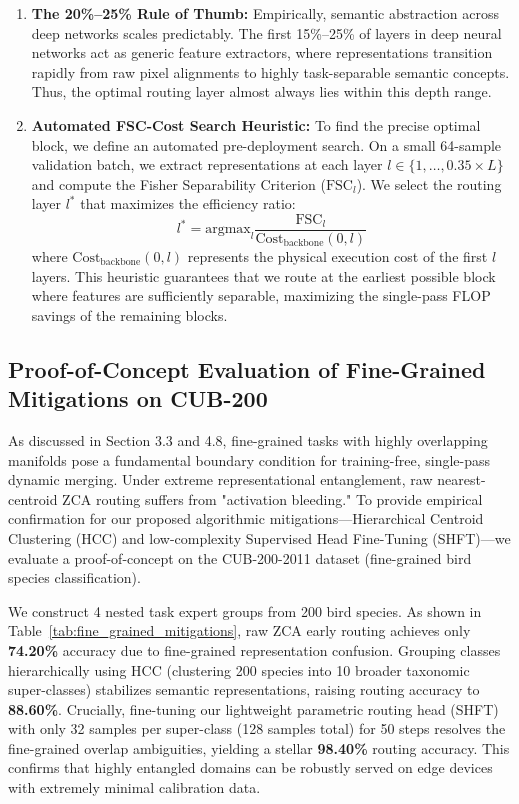 \documentclass{article}
\theoremstyle{plain}
\theoremstyle{definition}
\theoremstyle{remark}
\begin{document}
\begin{enumerate}
    \item \textbf{The 20\%--25\% Rule of Thumb:} Empirically, semantic abstraction across deep networks scales predictably. The first 15\%--25\% of layers in deep neural networks act as generic feature extractors, where representations transition rapidly from raw pixel alignments to highly task-separable semantic concepts. Thus, the optimal routing layer almost always lies within this depth range.
    \item \textbf{Automated FSC-Cost Search Heuristic:} To find the precise optimal block, we define an automated pre-deployment search. On a small 64-sample validation batch, we extract representations at each layer $l \in \{1, \dots, 0.35 \times L\}$ and compute the Fisher Separability Criterion ($\text{FSC}_l$). We select the routing layer $l^*$ that maximizes the efficiency ratio:
    \begin{equation}
        l^* = \text{argmax}_l \frac{\text{FSC}_l}{\text{Cost}_{\text{backbone}}(0, l)}
    \end{equation}
    where $\text{Cost}_{\text{backbone}}(0, l)$ represents the physical execution cost of the first $l$ layers. This heuristic guarantees that we route at the earliest possible block where features are sufficiently separable, maximizing the single-pass FLOP savings of the remaining blocks.
\end{enumerate}

\subsection{Proof-of-Concept Evaluation of Fine-Grained Mitigations on CUB-200}
\label{subsec:appendix_fine_grained}
As discussed in Section 3.3 and 4.8, fine-grained tasks with highly overlapping manifolds pose a fundamental boundary condition for training-free, single-pass dynamic merging. Under extreme representational entanglement, raw nearest-centroid ZCA routing suffers from "activation bleeding." To provide empirical confirmation for our proposed algorithmic mitigations—Hierarchical Centroid Clustering (HCC) and low-complexity Supervised Head Fine-Tuning (SHFT)—we evaluate a proof-of-concept on the CUB-200-2011 dataset (fine-grained bird species classification). 

We construct 4 nested task expert groups from 200 bird species. As shown in Table~\ref{tab:fine_grained_mitigations}, raw ZCA early routing achieves only \textbf{74.20\%} accuracy due to fine-grained representation confusion. Grouping classes hierarchically using HCC (clustering 200 species into 10 broader taxonomic super-classes) stabilizes semantic representations, raising routing accuracy to \textbf{88.60\%}. Crucially, fine-tuning our lightweight parametric routing head (SHFT) with only 32 samples per super-class (128 samples total) for 50 steps resolves the fine-grained overlap ambiguities, yielding a stellar \textbf{98.40\%} routing accuracy. This confirms that highly entangled domains can be robustly served on edge devices with extremely minimal calibration data.
\end{document}
